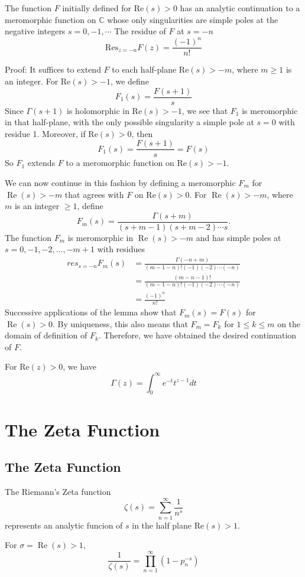 \documentclass[12pt, oneside]{book}
\begin{document}
\begin{lemma}
    The function $F$ initially defined for $\mathrm{Re}(s) > 0$ has an analytic continuation to a meromorphic function on $\mathbb{C}$ whose only singularities are simple poles at the negative integers $s=0,-1,\cdots$ The
    residue of $F$ at $s=-n$
    \[\mathrm{Res}_{z=-n} F (z)= \frac{(-1)^n}{n!}\]

    Proof: It suffices to extend $F$ to each half-plane $\mathrm{Re}(s)>-m$, where $m\geq 1$ is an integer. For $\mathrm{Re}(s)>-1$, we define
    $$F_1(s)=\frac{F(s+1)}{s}$$
    Since $\Gamma(s+1)$ is holomorphic in $\mathrm{Re}(s)>-1$, we see that $F_1$ is meromorphic in that half-plane, with the only possible singularity a simple pole at $s=0$ with residue 1. Moreover, if $\mathrm{Re}(s)>0$, then
    $$F_1(s)=\frac{F(s+1)}{s}=F(s)$$
    So $F_1$ extends $F$ to a meromorphic function on $\mathrm{Re}(s)>-1$.

    We can now continue in this fashion by defining a meromorphic $F_m$ for $\operatorname{Re}(s)>-m$ that agrees with $F$ on $\mathrm{Re}(s)>0$. For $\operatorname{Re}(s)>-m$, where $m$ is an integer $\geq 1$, define
    $$F_m(s)=\frac{\Gamma(s+m)}{(s+m-1)(s+m-2) \cdots s} .$$
    The function $F_m$ is meromorphic in $\operatorname{Re}(s)>-m$ and has simple poles at $s=0,-1,-2, \ldots,-m+1$ with residues
    $$\begin{aligned}
            res_{s=-n} F_m(s) & =\frac{\Gamma(-n+m)}{(m-1-n)!(-1)(-2) \cdots(-n)} \\
                              & =\frac{(m-n-1)!}{(m-1-n)!(-1)(-2) \cdots(-n)}     \\
                              & =\frac{(-1)^n}{n!}
        \end{aligned}$$
    Successive applications of the lemma show that $F_m(s)=F(s)$ for $\operatorname{Re}(s)>0$.
    By uniqueness, this also means that $F_m=F_k$ for $1 \leq k \leq m$ on the domain of definition of $F_k$. Therefore, we have obtained the desired continuation of $F$.
\end{lemma}
\begin{theorem}
    For $\mathrm{Re}(z) >0$, we have
    \[
        \Gamma(z)
        =
        \int_0^\infty e^{-t} t^{z-1} dt
    \]
\end{theorem}

\section{The Zeta Function}
\subsection{The Zeta Function}
\begin{theorem}
    The Riemann's Zeta function
    $$\zeta (s) = \sum_{n=1}^\infty \frac{1}{n^s}$$
    represents an analytic funcion of $s$ in the half plane $\mathrm{Re} (s) > 1$.
\end{theorem}
\begin{theorem}
    For $\sigma=\operatorname{Re} (s) >1$,
    $$
        \frac{1}{\zeta(s)}=\prod_{n=1}^{\infty}\left(1-p_n^{-s}\right)
    $$
\end{theorem}
\end{document}
